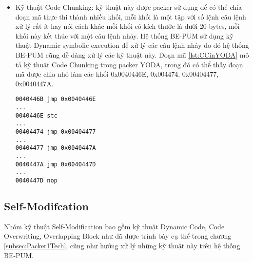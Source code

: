 \begin{enumerate}
{\begin{itemize}
{\begin{code}
\begin{lstlisting}[captionpos=b,caption={Kỹ thuật Overlapping Block sử dụng trong packer YODA},label={lst:OBinYODA},frame=single]
0040409D	dec al
0040409F	add al, cl
...
004040BF	retn 0x8B2C		
004040C2	clc
004040C3	stos es:[edi]
004040C4	loopd 0x00404092
00404092	lods ds:[edi]
...		
004040BD	jmp 0x004040C0
\end{lstlisting}
\end{code}
}
\item{Kỹ thuật Code Chunking: kỹ thuật này được packer sử dụng để có thể chia đoạn mã thực thi thành nhiều khối, mỗi khối là một tập với số lệnh câu lệnh xử lý rất ít hay nói cách khác mỗi khối có kích thước là dưới 20 bytes, mỗi khối này kết thúc với một câu lệnh nhảy. Hệ thống BE-PUM sử dụng kỹ thuật Dynamic symbolic execution để xử lý các câu lệnh nhảy do đó hệ thống BE-PUM cũng dễ dàng xử lý các kỹ thuật này. Đoạn mã \ref {lst:CCinYODA} mô tả kỹ thuật Code Chunking trong packer YODA, trong đó có thể thấy đoạn mã được chia nhỏ làm các khối 0x0040446E, 0x004474, 0x00404477, 0x0040447A.
\begin{code}
\begin{lstlisting}[captionpos=b,caption={Kỹ thuật Code Chunking sử dụng trong packer YODA},label={lst:CCinYODA},frame=single]
0040446B jmp 0x0040446E
... 
0040446E stc 
... 
00404474 jmp 0x00404477
...
00404477 jmp 0x0040447A
...
0040447A jmp 0x0040447D 
... 
0040447D nop
\end{lstlisting}
\end{code}
}
\end{itemize}
}
\end{enumerate}

\subsection{Self-Modifcation}
\hspace{0.5cm}Nhóm kỹ thuật Self-Modification bao gồm kỹ thuật Dynamic Code, Code Overwriting, Overlapping Block như đã được trình bày cụ thể trong chương \ref {subsec:Packer1Tech}, cũng như hướng xử lý những kỹ thuật này trên hệ thống BE-PUM.

